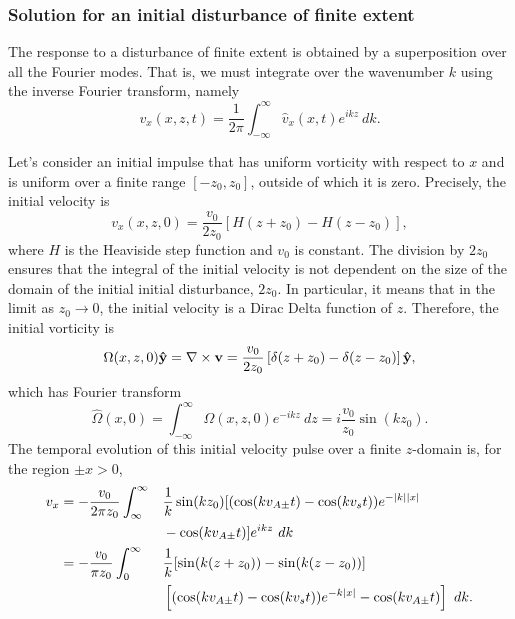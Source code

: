 \documentclass[12pt]{../style-files/ociamthesis}
\begin{document}
\subsubsection{Solution for an initial disturbance of finite extent}

The response to a disturbance of finite extent is obtained by a superposition over all the Fourier modes. That is, we must integrate over the wavenumber $k$ using the inverse Fourier transform, namely
\begin{equation}
v_x(x, z, t) = \frac{1}{2\pi}\int_{-\infty}^{\infty} \hat{v}_x(x, t) e^{ikz} ~dk.
\end{equation}

Let's consider an initial impulse that has uniform vorticity with respect to $x$ and is uniform over a finite range $[-z_0, z_0]$, outside of which it is zero. Precisely, the initial velocity is
\begin{equation}
v_x(x, z, 0) = \frac{v_0}{2z_0}\left[H(z + z_0) - H(z - z_0)\right],
\end{equation}
where $H$ is the Heaviside step function and $v_0$ is constant. The division by $2z_0$ ensures that the integral of the initial velocity is not dependent on the size of the domain of the initial initial disturbance, $2z_0$. In particular, it means that in the limit as $z_0 \to 0$, the initial velocity is a Dirac Delta function of $z$. Therefore, the initial vorticity is
\begin{equation}
\Omega(x, z, 0) \mathbf{\hat{y}} = \nabla \times \mathbf{v} = \frac{v_0}{2z_0}\left[\delta(z + z_0) - \delta(z - z_0)\right] \mathbf{\hat{y}},
\end{equation}
which has Fourier transform
\begin{equation}
\hat{\Omega}(x, 0) = \int_{-\infty}^{\infty} \Omega(x, z, 0) e^{-ikz} ~dz = i\frac{v_0}{z_0}\sin(kz_0).
\end{equation}
The temporal evolution of this initial velocity pulse over a finite $z$-domain is, for the region $\pm x > 0$,
\begin{alignat}{3}
v_x &= -\frac{v_0}{2\pi z_0} \int_{\infty}^{\infty} && \frac{1}{k}\sin(kz_0) [(\cos(kv_{A\pm}t) - \cos(kv_st))e^{-|k||x|} \notag \\ & &&- \cos(kv_{A\pm}t)] e^{ikz} ~dk \notag \\
& = -\frac{v_0}{\pi z_0} \int_{0}^{\infty} && \frac{1}{k} [\sin(k(z + z_0)) - \sin(k(z - z_0))] \notag \\ & && \left[(\cos(kv_{A\pm}t) - \cos(kv_st))e^{-k|x|} - \cos(kv_{A\pm}t)\right] ~dk. \label{vx intermediate}
\end{alignat}
\end{document}
